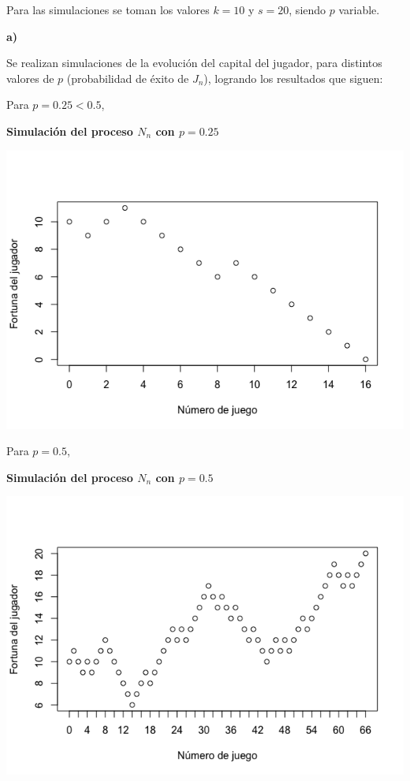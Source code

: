 \documentclass[11pt]{article}
\begin{document}
Para las simulaciones se toman los valores $k = 10$ y $s = 20$, siendo $p$ variable.

\textbf{a)}

Se realizan simulaciones de la evolución del capital del jugador, para distintos valores de $p$ (probabilidad de éxito de $J_n$), logrando los resultados que siguen:

Para $p = 0.25 < 0.5$,

\begin{center}\large\textbf{Simulación del proceso $N_n$ con $p = 0.25$}\end{center}
\vspace{-0.9cm}
\begin{center}\includegraphics[scale = 0.5]{fortuna1.png}\end{center}


Para $p = 0.5$,

\begin{center}\large\textbf{Simulación del proceso $N_n$ con $p = 0.5$}\end{center}
\vspace{-0.9cm}
\begin{center}\includegraphics[scale = 0.5]{fortuna2.png}\end{center}
\end{document}

